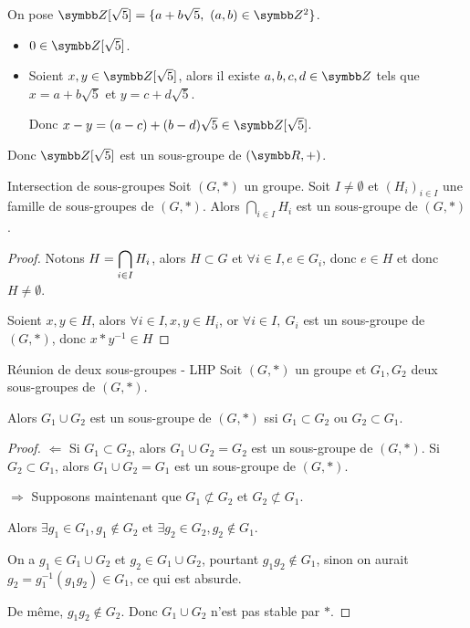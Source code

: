 \begin{exemple}
    On pose $\Z[\sqrt 5] = \{a + b \sqrt 5,~ (a,b) \in \Z^2\}$.
    \begin{itemize}
        \item $0 \in \Z[\sqrt 5]$.
        \item Soient $x,y \in \Z[\sqrt 5]$, alors il existe $a,b,c,d \in \Z$ tels que
        $x = a + b \sqrt 5$ et $y = c + d \sqrt 5$.

        Donc $x - y = (a - c) + (b - d) \sqrt 5 \in \Z[\sqrt 5]$.
    \end{itemize}

    Donc $\Z[\sqrt 5]$ est un sous-groupe de $(\R,+)$.
\end{exemple}

\begin{theoreme}{Intersection de sous-groupes}{}
    Soit $(G, \ast)$ un groupe. Soit $I \neq \emptyset$ et 
    $(H_i)_{i \in I}$ une famille de sous-groupes de $(G, \ast)$.
    Alors $\displaystyle \bigcap_{i \in I} H_i$ est un sous-groupe de $(G, \ast)$.
\end{theoreme}

\begin{proof}
    Notons $\displaystyle H = \bigcap_{i \in I} H_i$, alors $H \subset G$ 
    et $\forall i \in I, e \in G_i$, donc $e \in H$ et donc $H \neq \emptyset$.

    Soient $x, y \in H$, alors $\forall i \in I, x, y \in H_i$, or 
    $\forall i \in I,~G_i$ est un sous-groupe de $(G, \ast)$, donc $x \ast y^{-1} \in H$
\end{proof}

\begin{proposition}{Réunion de deux sous-groupes - LHP}{}
    Soit $(G, \ast)$ un groupe et $G_1, G_2$ deux sous-groupes de $(G, \ast)$.

    Alors $G_1 \cup G_2$ est un sous-groupe de $(G, \ast)$ ssi $G_1 \subset G_2$ ou $G_2 \subset G_1$.
\end{proposition}

\begin{proof}
    $\Leftarrow$ Si $G_1 \subset G_2$, alors $G_1 \cup G_2 = G_2$ est un sous-groupe de $(G, \ast)$.
    Si $G_2 \subset G_1$, alors $G_1 \cup G_2 = G_1$ est un sous-groupe de $(G, \ast)$.

    \avspace $\Rightarrow$ Supposons maintenant que $G_1 \not \subset G_2$ et $G_2 \not \subset G_1$.

    Alors $\exists g_1 \in G_1, g_1 \not \in G_2$ et $\exists g_2 \in G_2, g_2 \not \in G_1$.

    On a $g_1 \in G_1 \cup G_2$ et $g_2 \in G_1 \cup G_2$, pourtant $g_1 g_2 \not \in G_1$, 
    sinon on aurait $g_2 = g_1^{-1} (g_1 g_2) \in G_1$, ce qui est absurde.

    De même, $g_1 g_2 \not \in G_2$.
    Donc $G_1 \cup G_2$ n'est pas stable par $\ast$. 
\end{proof}

